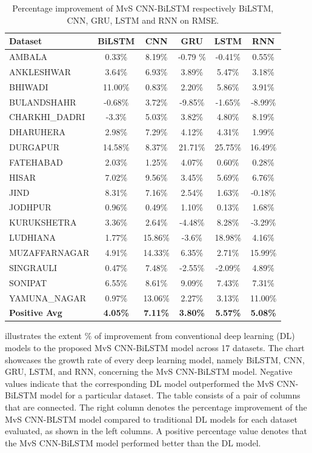 \documentclass[a4paper, fleqn]{cas-sc}
\theoremstyle{definition}
\theoremstyle{remark}
\begin{document}
  \begin{table}[]
    \caption{Percentage improvement of MvS CNN-BiLSTM respectively BiLSTM,  CNN,  GRU,  LSTM and RNN on RMSE.}
    \label{RMSE imp}
    \begin{tabular}{lccccc}
    \hline    Dataset        &   BiLSTM &   CNN &   GRU &   LSTM &   RNN \\ \hline
    AMBALA & 0.33\% & 8.19\% & -0.79 \% & -0.41\% & 0.55\% \\
    ANKLESHWAR & 3.64\% & 6.93\% & 3.89\% & 5.47\% & 3.18\% \\
    BHIWADI & 11.00\% & 0.83\% & 2.20\% & 5.86\% & 3.91\% \\
    BULANDSHAHR & -0.68\% & 3.72\% & -9.85\% & -1.65\% & -8.99\% \\
    CHARKHI\_DADRI &-3.3\% & 5.03\% & 3.82\% & 4.80\% & 8.19\% \\
    DHARUHERA & 2.98\% & 7.29\% & 4.12\% & 4.31\% & 1.99\% \\
    DURGAPUR & 14.58\% & 8.37\% & 21.71\% & 25.75\% & 16.49\% \\
    FATEHABAD & 2.03\% & 1.25\% & 4.07\% & 0.60\% & 0.28\% \\
    HISAR & 7.02\% & 9.56\% & 3.45\% & 5.69\% & 6.76\% \\
    JIND & 8.31\% & 7.16\% & 2.54\% & 1.63\% & -0.18\% \\
    JODHPUR & 0.96\% & 0.49\% & 1.10\% & 0.13\% & 1.68\% \\
    KURUKSHETRA & 3.36\% & 2.64\% & -4.48\% & 8.28\% & -3.29\% \\
    LUDHIANA & 1.77\% & 15.86\% & -3.6\% & 18.98\% & 4.16\% \\
    MUZAFFARNAGAR & 4.91\% & 14.33\% & 6.35\% & 2.71\% & 15.99\% \\
    SINGRAULI & 0.47\% & 7.48\% & -2.55\% & -2.09\% & 4.89\% \\
    SONIPAT & 6.55\% & 8.61\% & 9.09\% & 7.43\% & 7.31\% \\
    YAMUNA\_NAGAR & 0.97\% & 13.06\% & 2.27\% & 3.13\% & 11.00\% \\ \hline
    \textbf{Positive Avg}  & \textbf{4.05\%} & \textbf{7.11\%}& \textbf{3.80\%} & \textbf{5.57\%} & \textbf{5.08\%} \\ \hline
    \end{tabular}
    \end{table}
   illustrates the extent $\%$ of improvement from conventional deep learning (DL) models to the proposed MvS CNN-BiLSTM model across 17 datasets. The chart showcases the growth rate of every deep learning model,  namely BiLSTM,  CNN,  GRU,  LSTM,  and RNN, concerning the MvS CNN-BiLSTM model. Negative values indicate that the corresponding DL model outperformed the MvS CNN-BiLSTM model for a particular dataset. The table consists of a pair of columns that are connected. The right column denotes the percentage improvement of the MvS CNN-BLSTM model compared to traditional DL models for each dataset evaluated, as shown in the left columns.  A positive percentage value denotes that the MvS CNN-BiLSTM model performed better than the DL model.
\end{document}
